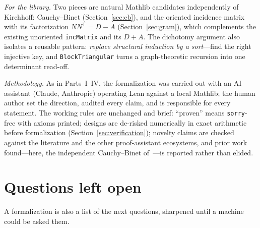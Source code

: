 \documentclass[11pt]{article}
\newcommand{\lean}[1]{\texttt{#1}}
\begin{document}
\emph{For the library.} Two pieces are natural Mathlib candidates independently of Kirchhoff:
Cauchy--Binet (Section~\ref{sec:cb}), and the oriented incidence matrix with its factorization
$NN^{\mathsf T}=D-A$ (Section~\ref{sec:gram}), which complements the existing unoriented
\lean{incMatrix} and its $D+A$. The dichotomy argument also isolates a reusable pattern:
\emph{replace structural induction by a sort}---find the right injective key, and
\lean{BlockTriangular} turns a graph-theoretic recursion into one determinant read-off.

\emph{Methodology.} As in Parts~I--IV, the formalization was carried out with an AI assistant
(Claude, Anthropic) operating Lean against a local Mathlib; the human author set the direction,
audited every claim, and is responsible for every statement. The working rules are unchanged
and brief: ``proven'' means \lean{sorry}-free with axioms printed; designs are de-risked
numerically in exact arithmetic before formalization (Section~\ref{sec:verification}); novelty
claims are checked against the literature and the other proof-assistant ecosystems, and prior
work found---here, the independent Cauchy--Binet of~\cite{FaabianRepo}---is reported rather
than elided.

\section{Questions left open}
\label{sec:questions}

A formalization is also a list of the next questions, sharpened until a machine could be asked
them.
\end{document}
